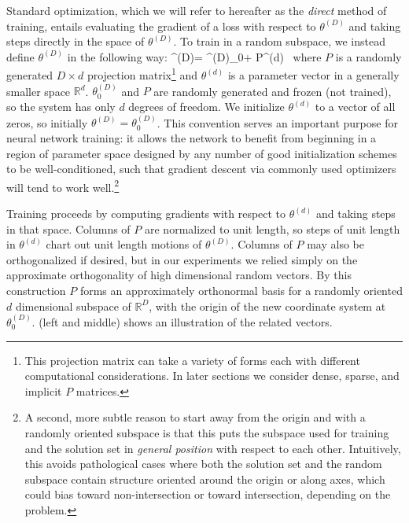 \documentclass{article} %
\newcommand{\thetad}{\theta^{(d)}}
\newcommand{\thetaD}{\theta^{(D)}}
\newcommand{\thetaDo}{\theta^{(D)}_0}
\begin{document}
Standard optimization, which we will refer to hereafter as the \emph{direct} method of training, entails evaluating the gradient of a loss with respect to $\thetaD$ and taking steps directly in the space of $\thetaD$. To train in a random subspace, we instead define $\thetaD$ in the following way:
%
\beq
\thetaD = \thetaDo + P\thetad~
\eeq
%
where $P$ is a randomly generated $D \times d$ projection matrix\footnote{This projection matrix can take a variety of forms each with different computational considerations. In later sections we consider dense, sparse, and implicit $P$ matrices.} and $\thetad$ is a parameter vector in a generally smaller space $\mathbb{R}^d$. $\thetaDo$ and $P$ are randomly generated and frozen (not trained), so the system has only $d$ degrees of freedom. We initialize $\thetad$ to a vector of all zeros, so initially $\thetaD = \thetaDo$. This convention serves an important purpose for neural network training:
it allows the network to benefit from beginning in a region of parameter space
designed by any number of good initialization schemes
\citep{glorot2010understanding,he2015delving}
to be well-conditioned, such that
gradient descent via commonly used optimizers will tend to work well.\footnote{A second, more subtle reason to start away from the origin and with a randomly oriented subspace is that this puts the subspace used for training and the solution set in \emph{general position} with respect to each other. Intuitively, this avoids pathological cases where both the solution set and the random subspace contain structure oriented around the origin or along axes, which could bias toward non-intersection or toward intersection, depending on the problem.}


Training proceeds by computing gradients with respect to $\thetad$ and taking steps in that space. Columns of $P$ are normalized to unit length, so steps of unit length in $\thetad$ chart out unit length motions of $\thetaD$. Columns of $P$ may also be orthogonalized if desired, but in our experiments we relied simply on the approximate orthogonality of high dimensional random vectors. By this construction $P$ forms an approximately orthonormal basis for a randomly oriented $d$ dimensional subspace of $\mathbb{R}^D$, with the origin of the new coordinate system at $\thetaDo$.  (left and middle) shows an illustration of the related vectors.
\end{document}
